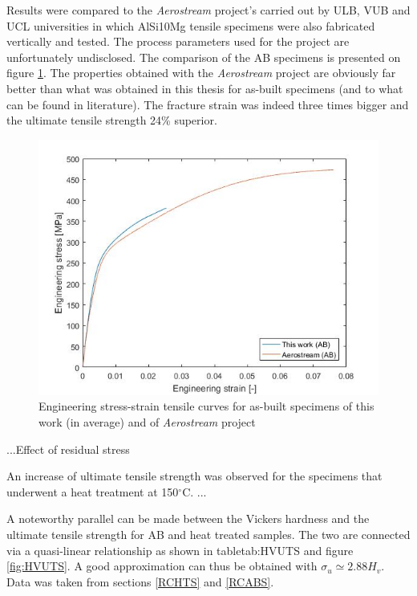 Results were compared to the \textit{Aerostream} project's carried out by ULB, VUB and UCL universities in which AlSi10Mg tensile specimens were also fabricated vertically and tested. The process parameters used for the project are unfortunately undisclosed. The comparison of the AB specimens is presented on figure \ref{fig:AerAB}. The properties obtained with the \textit{Aerostream} project are obviously far better than what was obtained in this thesis for as-built specimens (and to what can be found in literature). The fracture strain was indeed three times bigger and the ultimate tensile strength 24\% superior. \\

\begin{figure}[ht]
	\centering
	\centerline{\includegraphics[scale=0.64]{Images/AerAB}}
	\decoRule
	\caption[Engineering stress-strain tensile curves for as-built specimens of this work (in average) and of \textit{Aerostream} project]{Engineering stress-strain tensile curves for as-built specimens of this work (in average) and of \textit{Aerostream} project}
	\label{fig:AerAB}
\end{figure}

...Effect of residual stress

An increase of ultimate tensile strength was observed for the specimens that underwent a heat treatment at 150$^\circ$C. ...

A noteworthy parallel can be made between the Vickers hardness and the ultimate tensile strength for AB and heat treated samples. The two are connected via a quasi-linear relationship as shown in table{tab:HVUTS} and figure \ref{fig:HVUTS}. A good approximation can thus be obtained with $\sigma_u \simeq 2.88 H_v$. Data was taken from sections \ref{RCHTS} and \ref{RCABS}.

